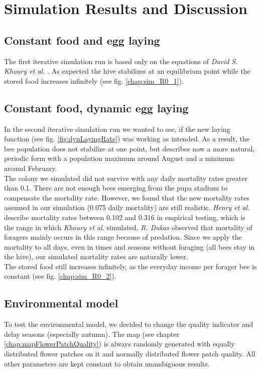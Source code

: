 \section{Simulation Results and Discussion}

\subsection{Constant food and egg laying}
	\label{chap:constantFoodConstantLaying}
	The first iterative simulation run is based only on the equations of \textit{David S. Khoury et al.} \cite{khoury13}. As expected the hive stabilizes at an equilibrium point while the stored food increases infinitely (see fig. \ref{chap:sim_R0_1}).

\subsection{Constant food, dynamic egg laying}
	\label{chap:constantFoodDynamicLaying}
	In the second iterative simulation run we wanted to see, if the new laying function (see fig. \ref{fig:dynLayingRate}) was working as intended. As a result, the bee population does not stabilize at one point, but describes now a more natural, periodic form with a population maximum around August and a minimum around February.\\
	
	The colony we simulated did not survive with any daily mortality rates greater than 0.1. There are not enough bees emerging from the pupa stadium to compensate the mortality rate. However, we found that the new mortality rates assumed in our simulation (0.075 daily mortality) are still realistic. \textit{Henry et al.} \cite{henry12} describe mortality rates between 0.102 and 0.316 in empirical testing, which is the range in which \textit{Khoury et al.} \cite{khoury13} simulated. \textit{R. Dukas} \cite{dukas08} observed that mortality of foragers mainly occurs in this range because of predation. Since we apply the mortality to all days, even in times and seasons without foraging (all bees stay in the hive), our simulated mortality rates are naturally lower.\\
	
	The stored food still increases infinitely, as the everyday income per forager bee is constant (see fig. \ref{chap:sim_R0_2}).

\subsection{Environmental model}
	\label{chap:environmentalModelDiscussion}
	To test the environmental model, we decided to change the quality indicator and delay seasons (especially autumn). The map (see chapter \ref{chap:mapFlowerPatchQuality}) is always randomly generated with equally distributed flower patches on it and normally distributed flower patch quality. All other parameters are kept constant to obtain unambiguous results.
	

